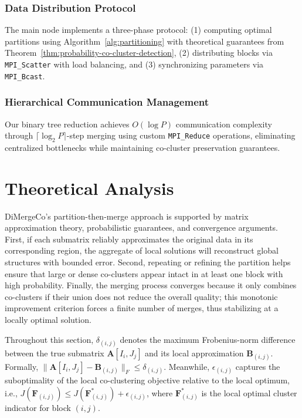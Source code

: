 \documentclass[journal]{IEEEtran}
\begin{document}
{\color{blue}
\subsubsection{Data Distribution Protocol}
\label{subsec:data-distribution-protocol}
The main node implements a three-phase protocol: (1) computing optimal partitions using Algorithm~\ref{alg:partitioning} with theoretical guarantees from Theorem~\ref{thm:probability-co-cluster-detection}, (2) distributing blocks via \texttt{MPI\_Scatter} with load balancing, and (3) synchronizing parameters via \texttt{MPI\_Bcast}.

\subsubsection{Hierarchical Communication Management}
\label{subsec:hierarchical-communication-management}
Our binary tree reduction achieves $O(\log P)$ communication complexity through $\lceil \log_2 P \rceil$-step merging using custom \texttt{MPI\_Reduce} operations, eliminating centralized bottlenecks while maintaining co-cluster preservation guarantees.
}

\section{Theoretical Analysis}
\label{sec:theoretical-foundations}

DiMergeCo's partition-then-merge approach is supported by matrix approximation theory, probabilistic guarantees, and convergence arguments. First, if each submatrix reliably approximates the original data in its corresponding region, the aggregate of local solutions will reconstruct global structures with bounded error. Second, repeating or refining the partition helps ensure that large or dense co-clusters appear intact in at least one block with high probability. Finally, the merging process converges because it only combines co-clusters if their union does not reduce the overall quality; this monotonic improvement criterion forces a finite number of merges, thus stabilizing at a locally optimal solution.

Throughout this section, $\delta_{(i,j)}$ denotes the maximum Frobenius-norm difference between the true submatrix $\mathbf{A}[I_i,J_j]$ and its local approximation $\mathbf{B}_{(i,j)}$. Formally, $\|\mathbf{A}[I_i, J_j] - \mathbf{B}_{(i,j)}\|_F \leq \delta_{(i,j)}$. Meanwhile, $\epsilon_{(i,j)}$ captures the suboptimality of the local co-clustering objective relative to the local optimum, i.e., $J(\mathbf{F}_{(i,j)}) \leq J(\mathbf{F}_{(i,j)}^*) + \epsilon_{(i,j)}$, where $\mathbf{F}_{(i,j)}^*$ is the local optimal cluster indicator for block $(i,j)$.
\end{document}
